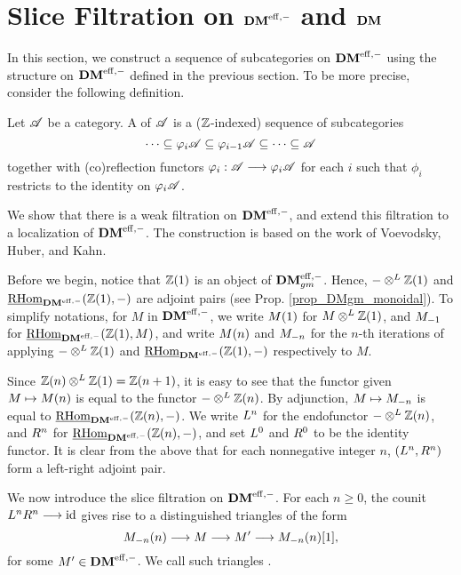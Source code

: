 \newpage
\section{Slice Filtration on $\DMeff$ and $\DM$}\label{sect_slice_filt_dm}

In this section, we construct a sequence of subcategories on 
$\DMeff$ using the structure on $\DMeff$ defined in the previous
section. To be more precise, consider the following definition.

\begin{defn}\label{def_cat_filtration}
Let $\Cat{A}$ be a category. A  of $\Cat{A}$ 
is a ($\Z$-indexed) sequence of subcategories
\[
\cdots \subseteq \phi_i\Cat{A} \subseteq \phi_{i - 1}\Cat{A} 
   \subseteq \cdots \subseteq \Cat{A}
\]
together with (co)reflection functors $\phi_i: \Cat{A} \to 
\phi_i\Cat{A}$ for each $i$ such that $\phi_i$ restricts to 
the identity on $\phi_i\Cat{A}$.
\end{defn}

We show that there is a weak filtration on $\DMeff$, and extend 
this filtration to a localization of $\DMeff$. The construction
is based on the work of Voevodsky, Huber, and Kahn.

Before we begin, notice that $\Z(1)$ is an object of $\DMeffgm$.
Hence, $-\tDM \Z(1)$ and $\ihomDMf(\Z(1), -)$ are adjoint pairs
(see Prop. \ref{prop_DMgm_monoidal}). To simplify notations, for 
$M$ in $\DMeff$, we write $\tZ{M}$ for $M \tDM \Z(1)$, and 
$\hZ{M}$ for $\ihomDMf(\Z(1), M)$, and write $\tZ[n]{M}$ and 
$\hZ[n]{M}$ for the $n$-th iterations of applying $- \tDM \Z(1)$ 
and $\ihomDMf(\Z(1), -)$ respectively to $M$. 

Since $\Z(n) \tDM \Z(1) = \Z(n + 1)$, it is easy to see that the 
functor given $M \mapsto \tZ[n]{M}$ is equal to the functor $- 
\tDM \Z(n)$. By adjunction, $M \mapsto \hZ[n]{M}$ is equal to 
$\ihomDMf(\Z(n), -)$. We write $\LDMf{n}$ for the endofunctor $- 
\tDM \Z(n)$, and $\RDMf{n}$ for $\ihomDMf(\Z(n), -)$, and set 
$\LDMf{0}$ and $\RDMf{0}$ to be the identity functor. It is clear 
from the above that for each nonnegative integer $n$, $(\LDMf{n}, 
\RDMf{n})$ form a left-right adjoint pair.

We now introduce the slice filtration on $\DMeff$. For each 
$n \geq 0$, the counit $\LDMf{n}\RDMf{n} \to \id$ gives rise to a 
distinguished triangles of the form
\begin{equation}\label{eq_slice_triangle_1}
\tZ[n]{\hZ[n]{M}} \to M \to M' \to \tZ[n]{\hZ[n]{M}}[1],
\end{equation}
for some $M' \in \DMeff$. We call such triangles .


